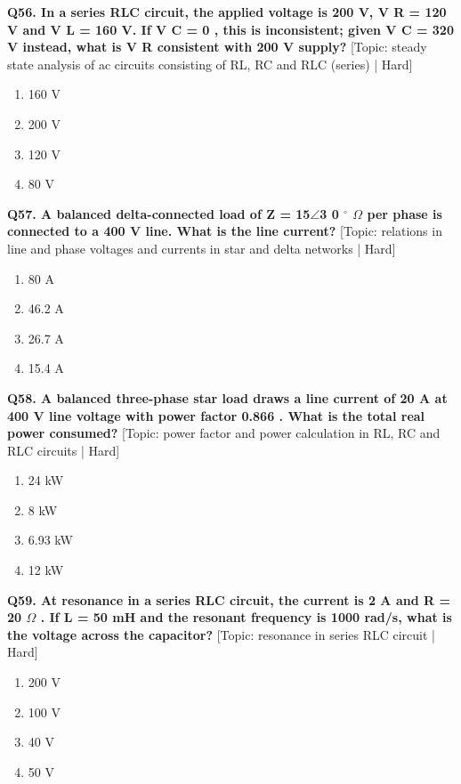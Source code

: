 \noindent\textbf{Q56. In a series RLC circuit, the applied voltage is 200 V, V R = 120 V and V L = 160 V. If V C = 0 , this is inconsistent; given V C = 320 V instead, what is V R consistent with 200 V supply?} \hfill [Topic: steady state analysis of ac circuits consisting of RL, RC and RLC (series) | Hard]
\begin{enumerate}[label=(\alph*),topsep=2pt,itemsep=1pt,partopsep=0pt,parsep=0pt]
    \item {160 V}
    \item {200 V}
    \item {120 V}
    \item {80 V}
\end{enumerate}
\vspace{2mm}

\noindent\textbf{Q57. A balanced delta-connected load of Z = 15$\angle$3 0 $^\circ$ $\Omega$ per phase is connected to a 400 V line. What is the line current?} \hfill [Topic: relations in line and phase voltages and currents in star and delta networks | Hard]
\begin{enumerate}[label=(\alph*),topsep=2pt,itemsep=1pt,partopsep=0pt,parsep=0pt]
    \item {80 A}
    \item {46.2 A}
    \item {26.7 A}
    \item {15.4 A}
\end{enumerate}
\vspace{2mm}

\noindent\textbf{Q58. A balanced three-phase star load draws a line current of 20 A at 400 V line voltage with power factor 0.866 . What is the total real power consumed?} \hfill [Topic: power factor and power calculation in RL, RC and RLC circuits | Hard]
\begin{enumerate}[label=(\alph*),topsep=2pt,itemsep=1pt,partopsep=0pt,parsep=0pt]
    \item {24 kW}
    \item {8 kW}
    \item {6.93 kW}
    \item {12 kW}
\end{enumerate}
\vspace{2mm}

\noindent\textbf{Q59. At resonance in a series RLC circuit, the current is 2 A and R = 20 $\Omega$ . If L = 50 mH and the resonant frequency is 1000 rad/s, what is the voltage across the capacitor?} \hfill [Topic: resonance in series RLC circuit | Hard]
\begin{enumerate}[label=(\alph*),topsep=2pt,itemsep=1pt,partopsep=0pt,parsep=0pt]
    \item {200 V}
    \item {100 V}
    \item {40 V}
    \item {50 V}
\end{enumerate}
\vspace{2mm}

